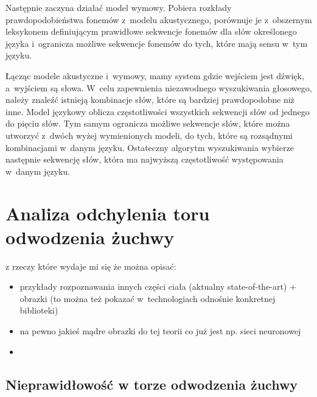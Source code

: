 Następnie zaczyna działać model wymowy. Pobiera rozkłady prawdopodobieństwa fonemów z~modelu akustycznego, porównuje je z~obszernym leksykonem definiującym prawidłowe sekwencje fonemów dla słów określonego języka i~ogranicza możliwe sekwencje fonemów do tych, które mają sensu w~tym języku.

Łącząc modele akustyczne i~wymowy, mamy system gdzie wejściem jest dźwięk, a~wyjściem są słowa. W~celu zapewnienia niezawodnego wyszukiwania głosowego, należy znaleźć istnieją kombinacje słów, które są bardziej prawdopodobne niż inne. Model językowy oblicza częstotliwości wszystkich sekwencji słów od jednego do pięciu słów. Tym samym ogranicza możliwe sekwencje słów, które można utworzyć z~dwóch wyżej wymienionych modeli, do tych, które są rozsądnymi kombinacjami w~danym języku. Ostateczny algorytm wyszukiwania wybierze następnie sekwencję słów, która ma najwyższą częstotliwość występowania w~danym języku.


\section{Analiza odchylenia toru odwodzenia żuchwy}
z rzeczy które wydaje mi się że można opisać:
\begin{itemize}
    \item przykłady rozpoznawania innych części ciała (aktualny state-of-the-art) + obrazki (to można też pokazać w~technologiach odnośnie konkretnej biblioteki)
    \item na pewno jakieś mądre obrazki do tej teorii co już jest np. sieci neuronowej
    \item 
\end{itemize}
\subsection{Nieprawidłowość w torze odwodzenia żuchwy}



